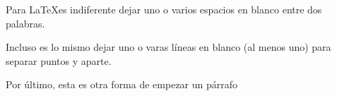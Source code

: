 \documentclass{article}
\begin{document}
Para                     \LaTeX es indiferente dejar uno o varios espacios  
en blanco entre dos palabras.




Incluso es lo mismo dejar uno o varas líneas en blanco (al menos uno)  
para separar puntos y aparte. \par Por último, esta es otra forma de empezar 
un párrafo
\end{document}
